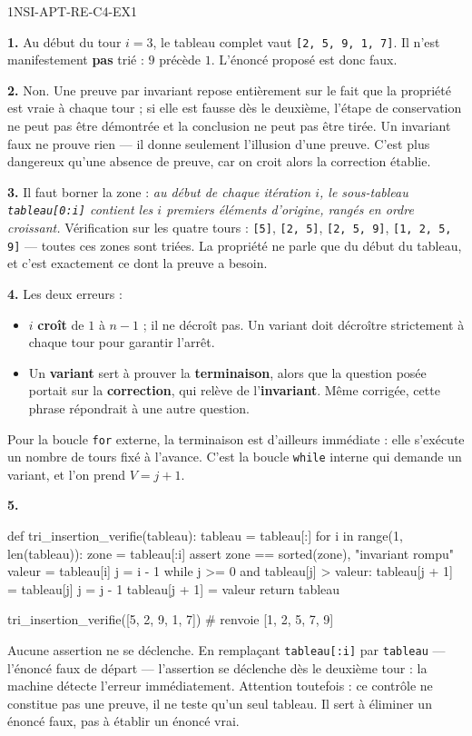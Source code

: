 \begin{corrige}{1NSI-APT-RE-C4-EX1}

\textbf{1.} Au début du tour $i=3$, le tableau complet vaut \lstinline{[2, 5, 9, 1, 7]}. Il
n'est manifestement \textbf{pas} trié : $9$ précède $1$. L'énoncé proposé est donc faux.

\textbf{2.} Non. Une preuve par invariant repose entièrement sur le fait que la propriété
est vraie à chaque tour ; si elle est fausse dès le deuxième, l'étape de conservation ne
peut pas être démontrée et la conclusion ne peut pas être tirée. Un invariant faux ne
prouve rien — il donne seulement l'illusion d'une preuve. C'est plus dangereux qu'une
absence de preuve, car on croit alors la correction établie.

\textbf{3.} Il faut borner la zone : \emph{au début de chaque itération $i$, le
sous-tableau \lstinline{tableau[0:i]} contient les $i$ premiers éléments d'origine, rangés
en ordre croissant.} Vérification sur les quatre tours : \lstinline{[5]},
\lstinline{[2, 5]}, \lstinline{[2, 5, 9]}, \lstinline{[1, 2, 5, 9]} — toutes ces zones sont
triées. La propriété ne parle que du début du tableau, et c'est exactement ce dont la
preuve a besoin.

\textbf{4.} Les deux erreurs :
\begin{itemize}
  \item $i$ \textbf{croît} de $1$ à $n-1$ ; il ne décroît pas. Un variant doit décroître
    strictement à chaque tour pour garantir l'arrêt.
  \item Un \textbf{variant} sert à prouver la \textbf{terminaison}, alors que la question
    posée portait sur la \textbf{correction}, qui relève de l'\textbf{invariant}. Même
    corrigée, cette phrase répondrait à une autre question.
\end{itemize}
Pour la boucle \lstinline{for} externe, la terminaison est d'ailleurs immédiate : elle
s'exécute un nombre de tours fixé à l'avance. C'est la boucle \lstinline{while} interne qui
demande un variant, et l'on prend $V = j + 1$.

\textbf{5.}
\begin{python}
def tri_insertion_verifie(tableau):
    tableau = tableau[:]
    for i in range(1, len(tableau)):
        zone = tableau[:i]
        assert zone == sorted(zone), "invariant rompu"
        valeur = tableau[i]
        j = i - 1
        while j >= 0 and tableau[j] > valeur:
            tableau[j + 1] = tableau[j]
            j = j - 1
        tableau[j + 1] = valeur
    return tableau

tri_insertion_verifie([5, 2, 9, 1, 7])   # renvoie [1, 2, 5, 7, 9]
\end{python}
Aucune assertion ne se déclenche. En remplaçant \lstinline{tableau[:i]} par
\lstinline{tableau} — l'énoncé faux de départ — l'assertion se déclenche dès le deuxième
tour : la machine détecte l'erreur immédiatement. Attention toutefois : ce contrôle ne
constitue pas une preuve, il ne teste qu'un seul tableau. Il sert à éliminer un énoncé
faux, pas à établir un énoncé vrai.

\end{corrige}
